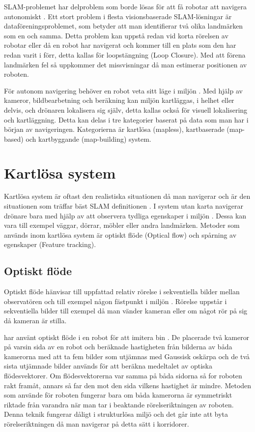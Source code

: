 SLAM-problemet har delproblem som borde lösas för att få robotar att navigera autonomiskt \citep{slamproblem}. Ett stort problem i flesta visionsbaserade SLAM-lösningar är dataföreningsproblemet, som betyder att man identifierar två olika landmärken som en och samma. Detta problem kan uppstå redan vid korta rörelsen av robotar eller då en robot har navigerat och kommer till en plats som den har redan varit i förr, detta kallas för loopstängning (Loop Closure). Med att förena landmärken fel så uppkommer det missvisningar då man estimerar positionen av roboten.

För autonom navigering behöver en robot veta sitt läge i miljön \citep{geospatial}. Med hjälp av kameror, bildbearbetning och beräkning kan miljön kartläggas, i helhet eller delvis, och drönaren lokalisera sig själv, detta kallas också för visuell lokalisering och kartläggning. Detta kan delas i tre kategorier baserat på data som man har i början av navigeringen. Kategorierna är kartlösa (mapless), kartbaserade (map-based) och kartbyggande (map-building) system. 

\section{Kartlösa system}

Kartlösa system är oftast den realistiska situationen då man navigerar och är den situationen som träffar bäst SLAM definitionen \citep{ProbabilisticRobotics}. I system utan karta navigerar drönare bara med hjälp av att observera tydliga egenskaper i miljön \citep{982903}. Dessa kan vara till exempel väggar, dörrar, möbler eller andra landmärken. Metoder som används inom kartlösa system är optiskt flöde (Optical flow) och spårning av egenskaper (Feature tracking). 

\subsection{Optiskt flöde}

Optiskt flöde hänvisar till uppfattad relativ rörelse i sekventiella bilder mellan observatören och till exempel någon fästpunkt i miljön \citep{opticalflowuav}. Rörelse uppstår i sekventiella bilder till exempel då man vänder kameran eller om något rör på sig då kameran är stilla. 

\cite{341094} har använt optiskt flöde i en robot för att imitera bin \citep{341094}. De placerade två kameror på varsin sida av en robot och beräknade hastigheten från bilderna av båda kamerorna med att ta fem bilder som utjämnas med Gaussisk oskärpa och de två sista utjämnade bilder används för att beräkna medeltalet av optiska flödesvektorer. Om flödesvektorerna var samma på båda sidorna så for roboten rakt framåt, annars så far den mot den sida vilkens hastighet är mindre. Metoden som \cite{341094} använde för roboten fungerar bara om båda kamerorna är symmetriskt riktade från varandra när man tar i beaktande rörelseriktningen av roboten. Denna teknik fungerar dåligt i strukturlösa miljö och det går inte att byta rörelseriktningen då man navigerar på detta sätt i korridorer. 

